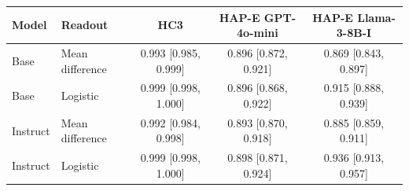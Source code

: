 \begin{tabular}{llccc}
\toprule
Model & Readout & HC3 & HAP-E GPT-4o-mini & HAP-E Llama-3-8B-I \\
\midrule
Base & Mean difference & 0.993 [0.985, 0.999] & 0.896 [0.872, 0.921] & 0.869 [0.843, 0.897] \\
Base & Logistic & 0.999 [0.998, 1.000] & 0.896 [0.868, 0.922] & 0.915 [0.888, 0.939] \\
Instruct & Mean difference & 0.992 [0.984, 0.998] & 0.893 [0.870, 0.918] & 0.885 [0.859, 0.911] \\
Instruct & Logistic & 0.999 [0.998, 1.000] & 0.898 [0.871, 0.924] & 0.936 [0.913, 0.957] \\
\bottomrule
\end{tabular}

